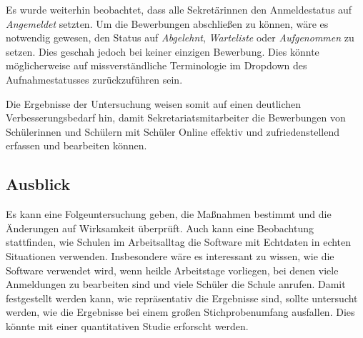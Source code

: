 Es wurde weiterhin beobachtet, dass alle Sekretärinnen den Anmeldestatus auf \textit{Angemeldet} setzten. Um die Bewerbungen abschließen zu können, wäre es notwendig gewesen, den Status auf \textit{Abgelehnt}, \textit{Warteliste} oder \textit{Aufgenommen} zu setzen. Dies geschah jedoch bei keiner einzigen Bewerbung. Dies könnte möglicherweise auf missverständliche Terminologie im Dropdown des Aufnahmestatusses zurückzuführen sein.

Die Ergebnisse der Untersuchung weisen somit auf einen deutlichen Verbesserungsbedarf hin, damit Sekretariatsmitarbeiter die Bewerbungen von Schülerinnen und Schülern mit Schüler Online effektiv und zufriedenstellend erfassen und bearbeiten können.

\subsection{Ausblick}
Es kann eine Folgeuntersuchung geben, die Maßnahmen bestimmt und die Änderungen auf Wirksamkeit überprüft.
Auch kann eine Beobachtung stattfinden, wie Schulen im Arbeitsalltag die Software mit Echtdaten in echten Situationen verwenden. Insbesondere wäre es interessant zu wissen, wie die Software verwendet wird, wenn heikle Arbeitstage vorliegen, bei denen viele Anmeldungen zu bearbeiten sind und viele Schüler die Schule anrufen.
Damit festgestellt werden kann, wie repräsentativ die Ergebnisse sind, sollte untersucht werden, wie die Ergebnisse bei einem großen Stichprobenumfang ausfallen. Dies könnte mit einer quantitativen Studie erforscht werden.
